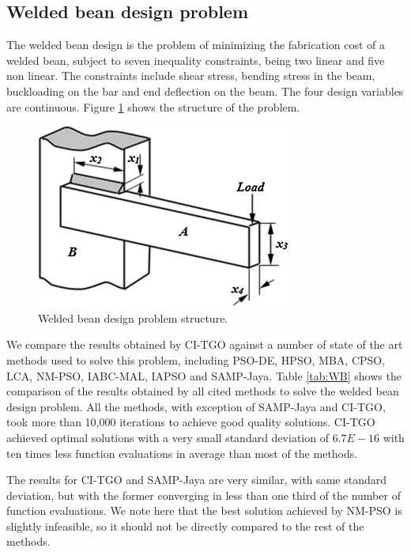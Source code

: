 \subsection{Welded bean design problem}

The welded bean design \citep{WB} is the problem of minimizing the fabrication cost of a welded bean, subject to seven inequality constraints, being two linear and five non linear. The constraints include shear stress, bending stress in the beam, buckloading on the bar and end deflection on the beam. The four design variables are continuous. Figure \ref{fig:WB} shows the structure of the problem.

\begin{figure}[h]
\begin{center}
\includegraphics[scale=0.7]{Imgs/WB.jpg}
\end{center}
\captionsetup{justification=centering}
\caption{Welded bean design problem structure.}\label{fig:WB}
\end{figure}

We compare the results obtained by CI-TGO against a number of state of the art methods used to solve this problem, including PSO-DE, HPSO, MBA, CPSO, LCA, NM-PSO, IABC-MAL, IAPSO and SAMP-Jaya. Table \ref{tab:WB} shows the comparison of the results obtained by all cited methods to solve the welded bean design problem. All the methods, with exception of SAMP-Jaya and CI-TGO, took more than 10,000 iterations to achieve good quality solutions. CI-TGO achieved optimal solutions with a very small standard deviation of $6.7E \!-\! 16$ with ten times less function evaluations in average than most of the methods.



The results for CI-TGO and SAMP-Jaya are very similar, with same standard deviation, but with the former converging in less than one third of the number of function evaluations. We note here that the best solution achieved by NM-PSO is slightly infeasible, so it should not be directly compared to the rest of the methods.




